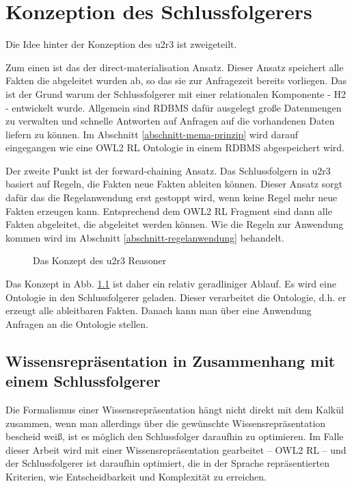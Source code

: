 \chapter{Konzeption des Schlussfolgerers}
Die Idee hinter der Konzeption des u2r3 ist zweigeteilt.

Zum einen ist das der direct-materialisation Ansatz. Dieser Ansatz speichert alle Fakten die abgeleitet wurden ab, so das sie zur Anfragezeit bereits vorliegen. Das ist der Grund warum der Schlussfolgerer mit einer relationalen Komponente - H2 - entwickelt wurde. Allgemein sind RDBMS dafür ausgelegt große Datenmengen zu verwalten und schnelle Antworten auf Anfragen auf die vorhandenen Daten liefern zu können. Im Abschnitt \ref{abschnitt-mema-prinzip} wird darauf eingegangen wie eine OWL2 RL Ontologie in einem RDBMS abgespeichert wird.

Der zweite Punkt ist der forward-chaining Ansatz. Das Schlussfolgern in u2r3 basiert auf Regeln, die Fakten neue Fakten ableiten können. Dieser Ansatz sorgt dafür das die Regelanwendung erst gestoppt wird, wenn keine Regel mehr neue Fakten erzeugen kann. Entsprechend dem OWL2 RL Fragment sind dann alle Fakten abgeleitet, die abgeleitet werden können. Wie die Regeln zur Anwendung kommen wird im Abschnitt \ref{abschnitt-regelanwendung} behandelt.

\begin{figure}[htb]
\begin{center}
  \caption{Das Konzept des u2r3 Reasoner}
  \label{image-konzept}
\end{center}
\end{figure}
Das Konzept in Abb. \ref{image-konzept} ist daher ein relativ geradliniger Ablauf. Es wird eine Ontologie in den Schlussfolgerer geladen. Dieser verarbeitet die Ontologie, d.h. er erzeugt alle ableitbaren Fakten. Danach kann man über eine Anwendung Anfragen an die Ontologie stellen.



\section{Wissensrepräsentation in Zusammenhang mit einem Schlussfolgerer}

Die Formalismus einer Wissensrepräsentation hängt nicht direkt mit dem Kalkül zusammen, wenn man allerdings über die gewünschte Wissensrepräsentation bescheid weiß, ist es möglich den Schlussfolger daraufhin zu optimieren. Im Falle dieser Arbeit wird mit einer Wissensrepräsentation gearbeitet -- OWL2 RL -- und der Schlussfolgerer ist daraufhin optimiert, die in der Sprache repräsentierten Kriterien, wie Entscheidbarkeit und Komplexität zu erreichen.

